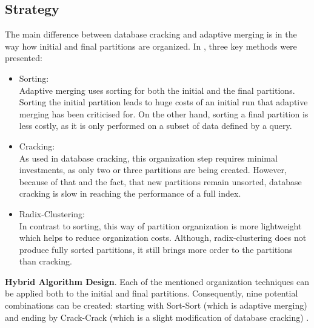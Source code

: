 \documentclass[10pt, conference, compsocconf]{IEEEtran}
\begin{document}
\subsection{Strategy}
\label{subsec:hybrid_strat}
The main difference between database cracking and adaptive merging is in the way how initial and final partitions are organized. In \cite{hybrid}, three key methods were presented:
\begin{itemize}
\item{Sorting:} \\
Adaptive merging uses sorting for both the initial and the final partitions. Sorting the initial partition leads to huge costs of an initial run that adaptive merging has been criticised for. On the other hand, sorting a final partition is less costly, as it is only performed on a subset of data defined by a query.\\
\item{Cracking: } \\
As used in database cracking, this organization step requires minimal investments, as only two or three partitions are being created. However, because of that and the fact, that new partitions remain unsorted, database cracking is slow in reaching the performance of a full index.\\
\item{Radix-Clustering: } \\
In contrast to sorting, this way of partition organization is more lightweight which helps to reduce organization costs. Although, radix-clustering does not produce fully sorted partitions, it still brings more order to the partitions than cracking.\\
\end{itemize}

\textbf{Hybrid Algorithm Design}. Each of the mentioned organization techniques can be applied both to the initial and final partitions. Consequently, nine potential combinations can be created: starting with Sort-Sort (which is adaptive merging) and ending by Crack-Crack (which is a slight modification of database cracking) \cite{hybrid}.
\end{document}
